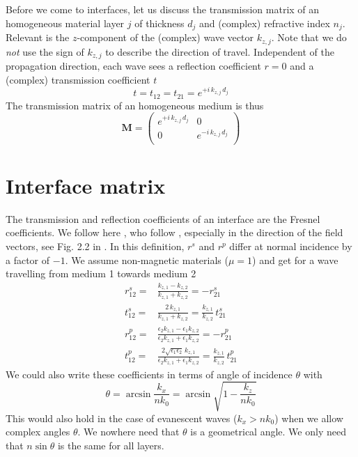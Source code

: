 Before we come to interfaces, let us discuss the transmission matrix of an homogeneous material layer $j$ of thickness $d_j$ and (complex) refractive index $n_j$. Relevant is the $z$-component of the (complex) wave vector $k_{z,j}$. Note that we do \emph{not} use the sign of  $k_{z,j}$ to describe the direction of travel.
Independent of the propagation direction, each wave sees a reflection coefficient $r=0$ and a (complex) transmission coefficient $t$
\begin{equation}
t = t_{12} = t_{21} = e^{+ i \, k_{z,j} \, d_j }
\end{equation}
The transmission matrix of an homogeneous medium is thus
\begin{equation}
\mathbf{M} = 
\begin{pmatrix}
e^{+i \, k_{z,j} \, d_j } & 0 \\0 & e^{-i \, k_{z,j} \, d_j } \\
\end{pmatrix}
\label{eq:M_prob}
\end{equation}


\section{Interface matrix}

The transmission and reflection coefficients of an interface are the Fresnel coefficients. We follow here \cite{Novotny-Hecht2012}, who follow \cite{BornWolf2002}, especially in the direction of the field vectors, see Fig. 2.2 in \cite{Novotny-Hecht2012}. In this definition,  $r^s$ and $r^p$ differ at normal incidence by a factor of $-1$. We assume non-magnetic materials ($\mu = 1$) and get for a wave travelling from medium 1 towards medium 2
\begin{align}
 r_{12}^s = & \frac{k_{z,1} - k_{z,2}}{k_{z,1} + k_{z,2}}  = - r_{21}^s\\
 t_{12}^s = & \frac{2 \, k_{z,1}}{k_{z,1} + k_{z,2}} =  \frac{k_{z,1}}{k_{z,2}}  \,  t_{21}^s\\
  r_{12}^p = & \frac{\epsilon_2	 k_{z,1} - \epsilon_1 k_{z,2}}
				  {\epsilon_2 k_{z,1} + \epsilon_1 k_{z,2}}  = - r_{21}^p\\
  t_{12}^p = & \frac{2 \sqrt{\epsilon_1 \epsilon_2}	 \,k_{z,1} }
				  {\epsilon_2 k_{z,1} + \epsilon_1 k_{z,2}}  = \frac{k_{z,1}}{k_{z,2}}  \,  t_{21}^p
\end{align}
We could also write these coefficients in terms of angle of incidence $\theta$ with
\begin{equation}
 \theta = \arcsin \frac{k_x}{n k_0} = \arcsin \sqrt{1 - \frac{k_z}{n k_0}}
\end{equation}
This would also hold in the case of evanescent waves ($k_x > n k_0$) when we allow complex angles $\theta$. We nowhere need that $\theta$ is a geometrical angle. We only need that $n \sin \theta$ is the same for all layers.


